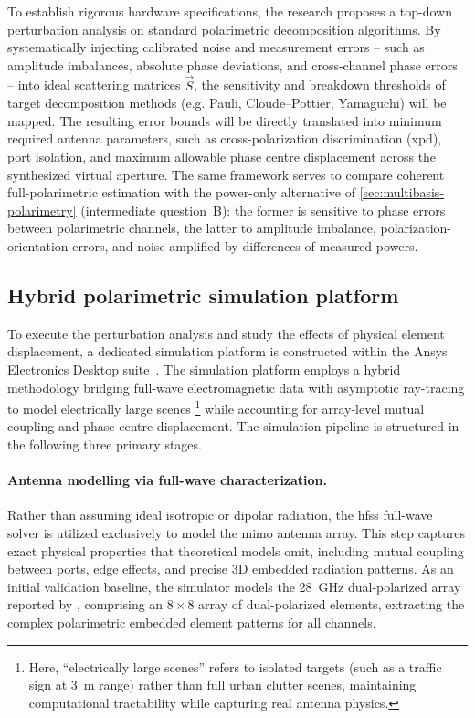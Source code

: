 To establish rigorous hardware specifications, the research proposes a top-down perturbation analysis on standard polarimetric decomposition algorithms.
By systematically injecting calibrated noise and measurement errors -- such as amplitude imbalances, absolute phase deviations, and cross-channel phase errors -- into ideal scattering matrices $\vec S$, the sensitivity and breakdown thresholds of target decomposition methods (e.g. Pauli, Cloude--Pottier, Yamaguchi) will be mapped.
The resulting error bounds will be directly translated into minimum required antenna parameters, such as cross-polarization discrimination (\gls{xpd}), port isolation, and maximum allowable phase centre displacement across the synthesized virtual aperture.
The same framework serves to compare coherent full-polarimetric estimation with the power-only alternative of \cref{sec:multibasis-polarimetry} (intermediate question~B): the former is sensitive to phase errors between polarimetric channels, the latter to amplitude imbalance, polarization-orientation errors, and noise amplified by differences of measured powers.


\subsection{Hybrid polarimetric simulation platform}
\label{sec:simulation-platform}

To execute the perturbation analysis and study the effects of physical element displacement, a dedicated simulation platform is constructed within the Ansys Electronics Desktop suite~\parencite{ansysAedt2025}.
The simulation platform employs a hybrid methodology bridging full-wave electromagnetic data with asymptotic ray-tracing to model electrically large scenes%
    \footnote{Here, \enquote{electrically large scenes} refers to isolated targets (such as a traffic sign at \qty{3}{m} range) rather than full urban clutter scenes, maintaining computational tractability while capturing real antenna physics.}
while accounting for array-level mutual coupling and phase-centre displacement.
The simulation pipeline is structured in the following three primary stages.

\paragraph{Antenna modelling via full-wave characterization.}
Rather than assuming ideal isotropic or dipolar radiation, the \gls{hfss} full-wave solver is utilized exclusively to model the \gls{mimo} antenna array.
This step captures exact physical properties that theoretical models omit, including mutual coupling between ports, edge effects, and precise 3D embedded radiation patterns.
As an initial validation baseline, the simulator models the \qty{28}{\giga\hertz} dual-polarized array reported by \textcite{fandiantoroExperimentalStudyPolarimetric2025}, comprising an $8 \times 8$ array of dual-polarized elements, extracting the complex polarimetric embedded element patterns for all channels.

